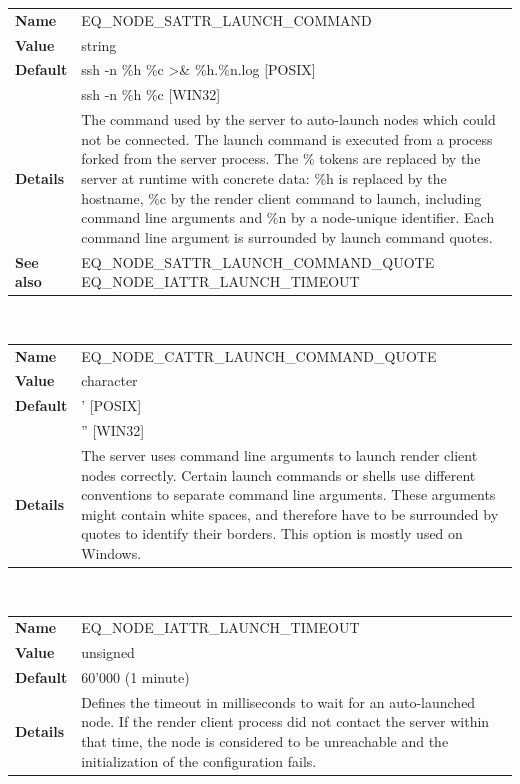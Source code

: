 \documentclass[10pt,a4]{scrartcl}
\begin{document}
\begin{center}
\begin{tabularx}{\textwidth}{|l|X|}
  \hline
  \textbf{Name} & EQ\_NODE\_SATTR\_LAUNCH\_COMMAND\\
  \textbf{Value} & string\\
  \textbf{Default} & ssh -n \%h \%c \textgreater\& \%h.\%n.log [POSIX]\\
                   & ssh -n \%h \%c [WIN32]\\
  \textbf{Details} & The command used by the server to auto-launch nodes
  which could not be connected. The launch command is executed from a
  process forked from the server process. The \% tokens are replaced by
  the server at runtime with concrete data: \%h is replaced by the
  hostname, \%c by the render client command to launch, including command line
  arguments and \%n by a node-unique identifier. Each command line
  argument is surrounded by launch command quotes.\\
  \textbf{See also} & EQ\_NODE\_SATTR\_LAUNCH\_COMMAND\_QUOTE 
  EQ\_NODE\_IATTR\_LAUNCH\_TIMEOUT\\
  \hline
\end{tabularx}\\\vfill

\begin{tabularx}{\textwidth}{|l|X|}
  \hline
  \textbf{Name} & EQ\_NODE\_CATTR\_LAUNCH\_COMMAND\_QUOTE\\
  \textbf{Value} & character\\
  \textbf{Default} & ' [POSIX]\\
                   & '' [WIN32]\\
  \textbf{Details} & The server uses command line arguments to launch
  render client nodes correctly. Certain launch commands or shells use
  different conventions to separate command line arguments. These
  arguments might contain white spaces, and therefore have to be
  surrounded by quotes to identify their borders. This option is mostly
  used on Windows.\\
  \hline
\end{tabularx}\\\vfill

\begin{tabularx}{\textwidth}{|l|X|}
  \hline
  \textbf{Name} & EQ\_NODE\_IATTR\_LAUNCH\_TIMEOUT\\
  \textbf{Value} & unsigned\\
  \textbf{Default} & 60'000 (1 minute)\\
  \textbf{Details} & Defines the timeout in milliseconds to wait for
  an auto-launched node. If the render client process did not contact
  the server within that time, the node is considered to be unreachable
  and the initialization of the configuration fails.\\
  \hline
\end{tabularx}\\\vfill


\end{center}
\end{document}
